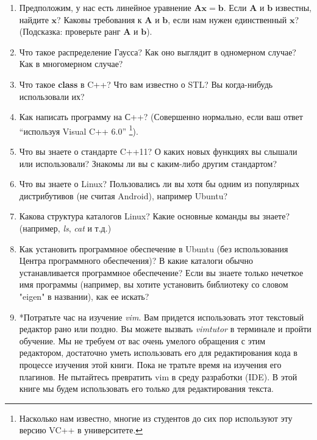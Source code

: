 \begin{Russian}
    \begin{enumerate}
    	\item Предположим, у нас есть линейное уравнение $\mathbf{Ax}=\mathbf{b}$. Если $\mathbf{A}$ и $\mathbf{b}$ известны, найдите $\mathbf{x}$? Каковы требования к $\mathbf{A}$ и $\mathbf{b}$, если нам нужен единственный $\mathbf{x}$? (Подсказка: проверьте ранг $\mathbf{A}$ и $\mathbf{b}$).
    
    	\item Что такое распределение Гаусса? Как оно выглядит в одномерном случае? Как в многомерном случае?
    
    	\item Что такое \textbf{class} в C++? Что вам известно о STL? Вы когда-нибудь использовали их?
    
    	\item Как написать программу на С++? (Совершенно нормально, если ваш ответ ``используя Visual C++ 6.0'' \footnote{Насколько нам известно, многие из студентов до сих пор используют эту версию VC++ в университете. }).
    
    	\item Что вы знаете о стандарте C++11? О каких новых функциях вы слышали или использовали? Знакомы ли вы с каким-либо другим стандартом?
    
    	\item Что вы знаете о Linux? Пользовались ли вы хотя бы одним из популярных дистрибутивов (не считая Android), например Ubuntu?
    
    	\item Какова структура каталогов Linux? Какие основные команды вы знаете? (например, \textit{ls}, \textit{cat} и т.д.)
    
    	\item Как установить программное обеспечение в Ubuntu (без использования Центра программного обеспечения)? В какие каталоги обычно устанавливается программное обеспечение? Если вы знаете только нечеткое имя программы (например, вы хотите установить библиотеку со словом "eigen" в названии), как ее искать?
    
    	\item *Потратьте час на изучение \textit{vim}. Вам придется использовать этот текстовый редактор рано или поздно. Вы можете вызвать \textit{vimtutor} в терминале и пройти обучение. Мы не требуем от вас очень умелого обращения с этим редактором, достаточно уметь использовать его для редактирования кода в процессе изучения этой книги. Пока не тратьте время на изучения его плагинов. Не пытайтесь превратить vim в среду разработки (IDE). В этой книге мы будем использовать его только для редактирования текста.
    
    \end{enumerate}
\end{Russian}

